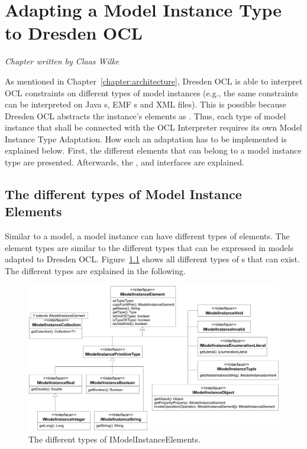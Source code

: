 \chapter{Adapting a Model Instance Type to Dresden OCL}
\label{chapter:modelInstanceTypeAdaptation}

\begin{flushright}
\textit{Chapter written by Claas Wilke}
\end{flushright}

As mentioned in Chapter~\ref{chapter:architecture}, Dresden OCL is able to
interpret OCL constraints on different types of model instances (e.g., the same
constraints can be interpreted on Java s, \acs{EMF}
s and \acs{XML} files). This is possible because Dresden OCL
abstracts the instance's elements as . Thus, each
type of model instance that shall be connected with the OCL Interpreter requires
its own Model Instance Type Adaptation. How such an adaptation has to be
implemented is explained below. First, the different elements that can belong
to a model instance type are presented. Afterwards, the
,  and
 interfaces are explained.


\section{The different types of Model Instance Elements}

Similar to a model, a model instance can have different types of elements. The
element types are similar to the different types that can be expressed in 
models adapted to Dresden OCL.
Figure~\ref{pic:modelInstanceTypeAdaptation:typeHierarchy} shows all different 
types of s that can exist. The different types are
explained in the following.

\begin{figure}
	\centering
	\includegraphics[width=1.0\linewidth]{figures/modelInstanceTypeAdaptation/typeHierarchy}
	\caption{The different types of IModelInstanceElements.}
	\label{pic:modelInstanceTypeAdaptation:typeHierarchy}
\end{figure}


